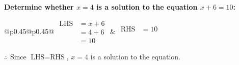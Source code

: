 \documentclass[12pt, varwidth, border={5mm 5mm 5mm 5mm}]{standalone}
\begin{document}
    \noindent \textbf{Determine whether \(x = 4\) is a solution to the equation \(x + 6 = 10\):}
\vspace{2pt}  %

\noindent
\renewcommand{\arraystretch}{1.3} %
\begin{tabular}{@{}p{0.45\linewidth}@{}p{0.45\linewidth}@{}}
    \(\begin{aligned}
        \text{LHS} &= x + 6 \\
                   &= 4 + 6 \\
                   &= 10 
    \end{aligned}\) &
    \(\begin{aligned}
        \text{RHS} &= 10\\
                   & \\
                   &
    \end{aligned}\)
\end{tabular}
\renewcommand{\arraystretch}{1.0} %
\vspace{2pt}  %

\noindent \(\therefore\) Since \(\text{LHS} = \text{RHS}\), \(x = 4\) is  a solution to the equation.
\end{document}
